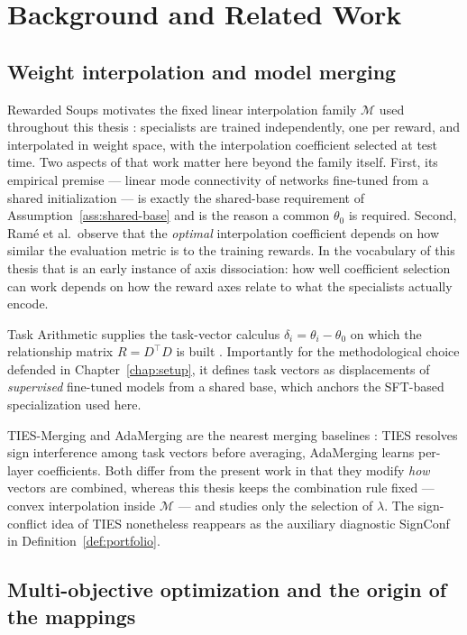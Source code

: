 \documentclass[12pt,a4paper]{report}
\newcommand{\1}{\mathbf{1}}
\newcommand{\Mfam}{\mathcal{M}}
\theoremstyle{definition}
\begin{document}
\chapter{Background and Related Work}
\label{chap:related}

\section{Weight interpolation and model merging}

Rewarded Soups motivates the fixed linear interpolation family \(\Mfam\) used throughout this thesis \citep{rame2023rewarded}: specialists are trained independently, one per reward, and interpolated in weight space, with the interpolation coefficient selected at test time. Two aspects of that work matter here beyond the family itself. First, its empirical premise --- linear mode connectivity of networks fine-tuned from a shared initialization --- is exactly the shared-base requirement of Assumption~\ref{ass:shared-base} and is the reason a common \(\theta_0\) is required. Second, Ram\'e et al.\ observe that the \emph{optimal} interpolation coefficient depends on how similar the evaluation metric is to the training rewards. In the vocabulary of this thesis that is an early instance of axis dissociation: how well coefficient selection can work depends on how the reward axes relate to what the specialists actually encode.

Task Arithmetic supplies the task-vector calculus \(\delta_i=\theta_i-\theta_0\) on which the relationship matrix \(R=D^\top D\) is built \citep{ilharco2022taskarithmetic}. Importantly for the methodological choice defended in Chapter~\ref{chap:setup}, it defines task vectors as displacements of \emph{supervised} fine-tuned models from a shared base, which anchors the SFT-based specialization used here.

TIES-Merging and AdaMerging are the nearest merging baselines \citep{yadav2023ties,yang2023adamerging}: TIES resolves sign interference among task vectors before averaging, AdaMerging learns per-layer coefficients. Both differ from the present work in that they modify \emph{how} vectors are combined, whereas this thesis keeps the combination rule fixed --- convex interpolation inside \(\Mfam\) --- and studies only the selection of \(\lambda\). The sign-conflict idea of TIES nonetheless reappears as the auxiliary diagnostic SignConf in Definition~\ref{def:portfolio}.

\section{Multi-objective optimization and the origin of the mappings}
\label{sec:related-moo}
\end{document}
